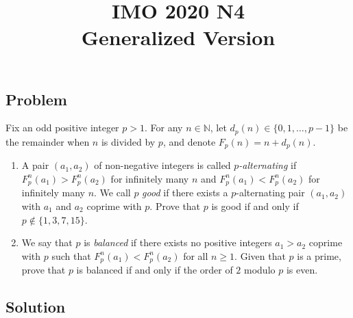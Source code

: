 \documentclass{article}
\title{IMO 2020 N4 \\ Generalized Version}
\date{}
\author{}
\newcommand{\N}{\mathbb{N}}
\begin{document}
\maketitle



\subsection*{Problem}

Fix an odd positive integer $p > 1$.
For any $n \in \N$, let $d_p(n) \in \{0, 1, \ldots, p - 1\}$ be the remainder when $n$ is divided by $p$, and denote $F_p(n) = n + d_p(n)$.

\begin{enumerate}

\item
A pair $(a_1, a_2)$ of non-negative integers is called \emph{$p$-alternating} if $F_p^n(a_1) > F_p^n(a_2)$ for infinitely many $n$ and $F_p^n(a_1) < F_p^n(a_2)$ for infinitely many $n$.
We call $p$ \emph{good} if there exists a $p$-alternating pair $(a_1, a_2)$ with $a_1$ and $a_2$ coprime with $p$.
Prove that $p$ is good if and only if $p \notin \{1, 3, 7, 15\}$.

\item
We say that $p$ is \emph{balanced} if there exists no positive integers $a_1 > a_2$ coprime with $p$ such that $F_p^n(a_1) < F_p^n(a_2)$ for all $n \geq 1$.
Given that $p$ is a prime, prove that $p$ is balanced if and only if the order of $2$ modulo $p$ is even.

\end{enumerate}



\subsection*{Solution}
\end{document}
